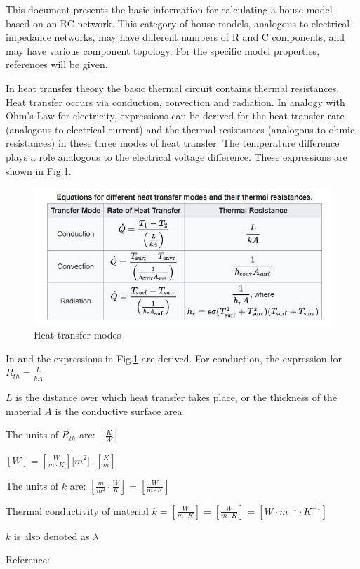 This document presents the basic information for calculating a house model based on an RC network. This category of house models, analogous to electrical impedance networks, may have different numbers of R and C components, and may have various component topology. For the specific model properties, references will be given.

In heat transfer theory the basic thermal circuit contains thermal resistances. Heat transfer occurs via conduction, convection and radiation. In analogy with Ohm's Law for electricity, expressions can be derived for the heat transfer rate (analogous to electrical current) and the thermal resistances (analogous to ohmic resistances) in these three modes of heat transfer. The temperature difference plays a role analogous to the electrical voltage difference. These expressions are shown in Fig.\ref{table_1}.
\begin{figure}[H]
	\centering
	\includegraphics[width=0.8\columnwidth]{Pictures/heat transfer mode.JPG}
	\caption[Short title]{Heat transfer modes\cite{GIGO}}
	\label{table_1}
\end{figure}
\newpage
In \cite{HTTHERMO} and \cite{FUND} the expressions in Fig.\ref{table_1} are derived.
For conduction, the expression for $R_{th} = \frac{L}{k\dot A}$

$L$ is the distance over which heat transfer takes place, or the thickness of the material
$A$ is the conductive surface area

The units of $R_{th}$ are: $ [\frac{K}{W}] $

$ [W] = [\frac{W}{m \cdot K}] \dot [m^2] \cdot [\frac{K}{m}] $

The units of $k$ are: $ [\frac{m}{m^2} \cdot \frac{W}{K}] = [\frac{W}{m \cdot K}]$

Thermal conductivity of material $k = [\frac{W}{m \cdot K }] = [\frac{W}{m \cdot K }]  = [W \cdot m^{-1} \cdot K^{-1}]$

$k$ is also denoted as $\lambda$

Reference: \cite{ELECRESCOND}

